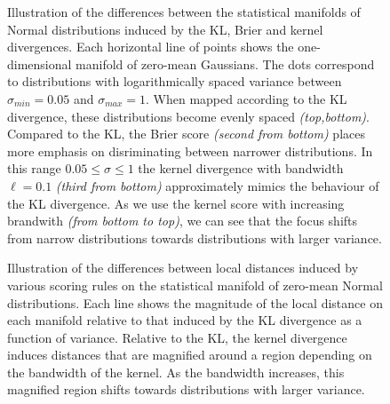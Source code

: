 \begin{figure} %
	\begin{center}
	\end{center}
	\caption[Brier, kernel and logarithmic scoring of Normal distributions]{Illustration of the differences between the statistical manifolds of Normal distributions induced by the KL, Brier and kernel divergences. Each horizontal line of points shows the one-dimensional manifold of zero-mean Gaussians. The dots correspond to distributions with logarithmically spaced variance between $\sigma_{min}=0.05$ and $\sigma_{max}=1$. When mapped according to the KL divergence, these distributions become evenly spaced \emph{(top,bottom)}. Compared to the KL, the Brier score \emph{(second from bottom)} places more emphasis on disriminating between narrower distributions. In this range $0.05 \leq \sigma \leq 1$ the kernel divergence with bandwidth $\ell=0.1$ \emph{(third from bottom)} approximately mimics the behaviour of the KL divergence. As we use the kernel score with increasing brandwith \emph{(from bottom to top)}, we can see that the focus shifts from narrow distributions towards distributions with larger variance.\label{fig:Normal_varonly_comparison}}
\end{figure}

\begin{figure}[t] %
	\begin{center}
	\end{center}
	\caption[Local distances on the statistical manifold of Normal distributions]{Illustration of the differences between local distances induced by various scoring rules on the statistical manifold of zero-mean Normal distributions. Each line shows the magnitude of the local distance on each manifold relative to that induced by the KL divergence as a function of variance. Relative to the KL, the kernel divergence induces distances that are magnified around a region depending on the bandwidth of the kernel. As the bandwidth increases, this magnified region shifts towards distributions with larger variance.	\label{fig:Normal_varonly_magnification}}
\end{figure}

